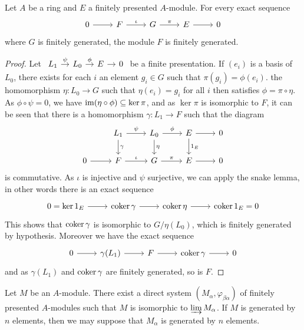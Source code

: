 \begin{proposition}\label{module fp ses ker finite}
Let $A$ be a ring and $E$ a finitely presented $A$-module. For every exact sequence
\[\begin{tikzcd}
0\ar[r]&F\ar[r,"\iota"]&G\ar[r,"\pi"]&E\ar[r]&0
\end{tikzcd}\]
where $G$ is finitely generated, the module $F$ is finitely generated.
\end{proposition}
\begin{proof}
Let $\begin{tikzcd}[column sep=10pt]L_1\ar[r,"\psi"]&L_0\ar[r,"\phi"]&E\ar[r]&0 \end{tikzcd}$ be a finite presentation. If $(e_i)$ is a basis of $L_0$, there exists for each $i$ an element $g_i\in G$ such that $\pi(g_i)=\phi(e_i)$. the homomorphism $\eta:L_0\to G$ such that $\eta(e_i)=g_i$ for all $i$ then satisfies $\phi=\pi\circ\eta$. As $\phi\circ\psi=0$, we have $\operatorname{im}(\eta\circ\phi)\subseteq\operatorname{ker}\pi$, and as $\ker\pi$ is isomorphic to $F$, it can be seen that there is a homomorphism $\gamma:L_1\to F$ such that the diagram
\[\begin{tikzcd}
&L_1\ar[r,"\psi"]\ar[d,"\gamma"]&L_0\ar[r,"\phi"]\ar[d,"\eta"]&E\ar[r]\ar[d,"1_E"]&0\\
0\ar[r]&F\ar[r,"\iota"]&G\ar[r,"\pi"]&E\ar[r]&0
\end{tikzcd}\]
is commutative. As $\iota$ is injective and $\psi$ surjective, we can apply the snake lemma, in other words there is an exact sequence
\[\begin{tikzcd}
0=\ker 1_E\ar[r]&\coker\gamma\ar[r]&\coker\eta\ar[r]&\coker 1_E=0
\end{tikzcd}\]
This shows that $\operatorname{coker}\gamma$ is isomorphic to $G/\eta(L_0)$, which is finitely generated by hypothesis. Moreover we have the exact sequence
\[\begin{tikzcd}
0\ar[r]&\gamma(L_1)\ar[r]&F\ar[r]&\coker\gamma\ar[r]&0
\end{tikzcd}\]
and as $\gamma(L_1)$ and $\operatorname{coker}\gamma$ are finitely generated, so is $F$.
\end{proof}
\begin{proposition}\label{module is direct limit of finitely presented}
Let $M$ be an $A$-module. There exist a direct system $(M_\alpha,\varphi_{\beta\alpha})$ of finitely presented $A$-modules such that $M$ is isomorphic to $\varinjlim M_\alpha$. If $M$ is generated by $n$ elements, then we may suppose that $M_\alpha$ is generated by $n$ elements.
\end{proposition}
